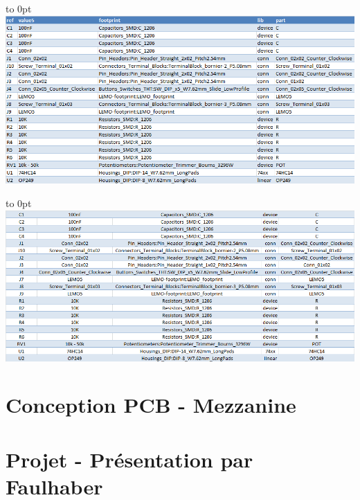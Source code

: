 \documentclass[french,a4paper,12pt]{report}
\begin{document}
		\hfill\hbox to 0pt{\hss\includegraphics[width=15cm]{AOP_Liste_Compos.png}\hss}\hfill\null\newline
		
		\hfill\hbox to 0pt{\hss\includegraphics[width=15cm]{AOP_ListeComposants.png}\hss}\hfill\null\newline
		
	\chapter{Conception PCB - Mezzanine}
		
			
		
		
		
			
		
	\chapter{Projet - Présentation par Faulhaber}
		
\end{document}
